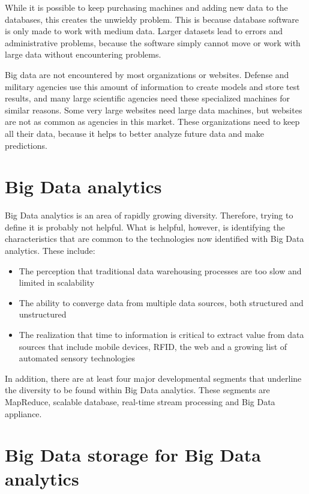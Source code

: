 \documentclass[12pt]{article}
\begin{document}
While it is possible to keep purchasing machines and adding new data to the databases, this creates the unwieldy problem. This is because database software is only made to work with medium data. Larger datasets lead to errors and administrative problems, because the software simply cannot move or work with large data without encountering problems.


Big data are not encountered by most organizations or websites. Defense and military agencies use this amount of information to create models and store test results, and many large scientific agencies need these specialized machines for similar reasons. Some very large websites need large data machines, but websites are not as common as agencies in this market. These organizations need to keep all their data, because it helps to better analyze future data and make predictions.

\newpage
\section{Big Data analytics}


Big Data analytics is an area of rapidly growing diversity. Therefore, trying to define it is probably not helpful. What is helpful, however, is identifying the characteristics that are common to the technologies now identified with Big Data analytics. These include:

\begin{itemize}
	\item
	The perception that traditional data warehousing processes are too slow and limited in scalability
	\item
	The ability to converge data from multiple data sources, both structured and unstructured
	\item
	The realization that time to information is critical to extract value from data sources that include mobile devices, RFID, the web and a growing list of automated sensory technologies
\end{itemize}


In addition, there are at least four major developmental segments that underline the diversity to be found within Big Data analytics. These segments are MapReduce, scalable database, real-time stream processing and Big Data appliance.

\newpage
\section{Big Data storage for Big Data analytics}
\end{document}
